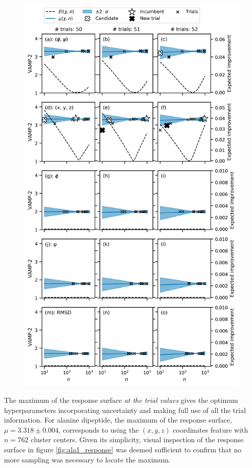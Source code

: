 \begin{figure}[p]
    \includegraphics[height=0.75\textheight]{chapters/msm_optimization/figures/ala1_opt_explainer.png}
    \label{fig:msm_opt_explainer}
\end{figure}

The maximum of the response surface \emph{at the trial values} gives the optimum hyperparameters incorporating uncertainty and making full use of all the trial information. For alanine dipeptide, the maximum of the response surface, $\mu=\num{3.318}\pm\num{0.004}$, corresponds to using the $(x, y, z)$ coordinates feature with $n=762$ cluster centers. Given its simplicity, visual inspection of the response surface in figure \ref{fig:ala1_response} was deemed sufficient to confirm that no more sampling was necessary to locate the maximum. 

